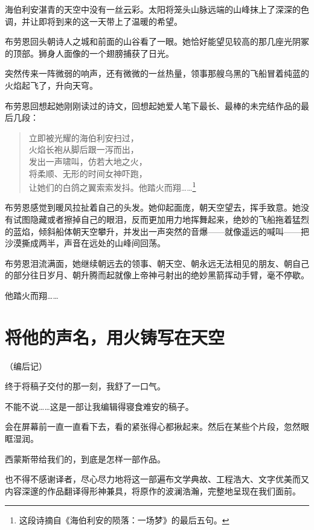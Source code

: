 \documentclass[AutoFakeBold=true]{book}
\begin{document}
海伯利安湛青的天空中没有一丝云彩。太阳将笼头山脉远端的山峰抹上了深深的色调，并让即将到来的这一天带上了温暖的希望。

布劳恩回头朝诗人之城和前面的山谷看了一眼。她恰好能望见较高的那几座光阴冢的顶部。狮身人面像的一个翅膀捕获了日光。

突然传来一阵微弱的响声，还有微微的一丝热量，领事那艘乌黑的飞船冒着纯蓝的火焰起飞了，升向天穹。

布劳恩回想起她刚刚读过的诗文，回想起她爱人笔下最长、最棒的未完结作品的最后几段：

\begin{quote}
	{\kaishu 立即被光耀的海伯利安扫过，\\
	火焰长袍从脚后跟一泻而出，\\
	发出一声啸叫，仿若大地之火，\\
	将柔顺、无形的时间女神吓跑，\\
	让她们的白鸽之翼索索发抖。他踏火而翔……}\footnote{这段诗摘自《海伯利安的陨落：一场梦》的最后五句。}
\end{quote}

布劳恩感觉到暖风拉扯着自己的头发。她仰起面庞，朝天空望去，挥手致意。她没有试图隐藏或者擦掉自己的眼泪，反而更加用力地挥舞起来，绝妙的飞船拖着猛烈的蓝焰，倾斜船体朝天空攀升，并发出一声突然的音爆——就像遥远的喊叫——把沙漠撕成两半，声音在远处的山峰间回荡。

布劳恩泪流满面，她继续朝远去的领事、朝天空、朝永远无法相见的朋友、朝自己的部分往日岁月、朝升腾而起就像上帝神弓射出的绝妙黑箭挥动手臂，毫不停歇。

{\kaishu 他踏火而翔……}

\chapter*{将他的声名，用火铸写在天空}

\begin{center}
	（编后记）
\end{center}

终于将稿子交付的那一刻，我舒了一口气。

不能不说……这是一部让我编辑得寝食难安的稿子。

会在屏幕前一直一直看下去，看的紧张得心都揪起来。然后在某些个片段，忽然眼眶湿润。

西蒙斯带给我们的，到底是怎样一部作品。

也不得不感谢译者，尽心尽力地将这一部遍布文学典故、工程浩大、文字优美而又内容深邃的作品翻译得形神兼具，将原作的波澜浩瀚，完整地呈现在我们面前。
\end{document}
